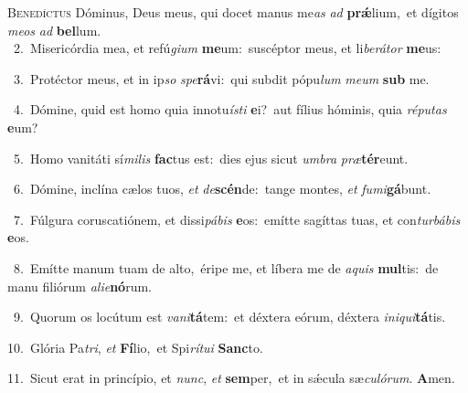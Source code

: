 \lettrine{\initial\textcolor{\initialcolor}{B}}{enedíctus} Dóminus, Deus meus, qui docet manus me\textit{as} \textit{ad} \textbf{prǽ}\-lium,~\star et dígitos \textit{me}\-\textit{os} \textit{ad} \textbf{bel}\-lum.\\
{\numbfont\textcolor{\numbcolor}{~2.}}~Misericórdia mea, et refú\-\textit{gi}\-\textit{um} \textbf{me}\-um:~\star suscéptor meus, et li\-\textit{be}\-\textit{rá}\textit{tor} \textbf{me}\-us:\par
{\numbfont\textcolor{\numbcolor}{~3.}}~Protéctor meus, et in ip\textit{so} \textit{spe}\-\textbf{rá}vi:~\star qui subdit pópu\textit{lum} \textit{me}\-\textit{um} \textbf{sub} me.\par
{\numbfont\textcolor{\numbcolor}{~4.}}~Dómine, quid est homo quia innotu\-\textit{ís}\-\textit{ti} \textbf{e}\-i?~\star aut fílius hóminis, quia \textit{ré}\-\textit{pu}\textit{tas} \textbf{e}\-um?\par
{\numbfont\textcolor{\numbcolor}{~5.}}~Homo vanitáti sí\-\textit{mi}\-\textit{lis} \textbf{fac}\-tus est:~\star dies ejus sicut \textit{um}\-\textit{bra} \textit{præ}\-\textbf{tér}eunt.\par
{\numbfont\textcolor{\numbcolor}{~6.}}~Dómine, inclína cælos tuos, \textit{et} \textit{de}\-\textbf{scén}de:~\star tange montes, \textit{et} \textit{fu}\-\textit{mi}\textbf{gá}bunt.\par
{\numbfont\textcolor{\numbcolor}{~7.}}~Fúlgura coruscatiónem, et dissi\-\textit{pá}\-\textit{bis} \textbf{e}\-os:~\star emítte sagíttas tuas, et con\-\textit{tur}\-\textit{bá}\textit{bis} \textbf{e}\-os.\par
{\numbfont\textcolor{\numbcolor}{~8.}}~Emítte manum tuam de alto,~\dagger éripe me, et líbera me de \textit{a}\-\textit{quis} \textbf{mul}\-tis:~\star de manu filiórum \textit{a}\-\textit{li}\textit{e}\textbf{nó}rum.\par
{\numbfont\textcolor{\numbcolor}{~9.}}~Quorum os locútum est \textit{va}\-\textit{ni}\textbf{tá}tem:~\star et déxtera eórum, déxtera \textit{in}\-\textit{i}\textit{qui}\textbf{tá}tis.\par
{\numbfont\textcolor{\numbcolor}{10.}}~Glória Pa\-\textit{tri}\-, \textit{et} \textbf{Fí}\-lio,~\star et Spi\-\textit{rí}\-\textit{tu}\textit{i} \textbf{Sanc}\-to.\par
{\numbfont\textcolor{\numbcolor}{11.}}~Sicut erat in princípio, et \textit{nunc}\-, \textit{et} \textbf{sem}\-per,~\star et in sǽcula sæ\-\textit{cu}\-\textit{ló}\textit{rum}. \textbf{A}\-men.\par
